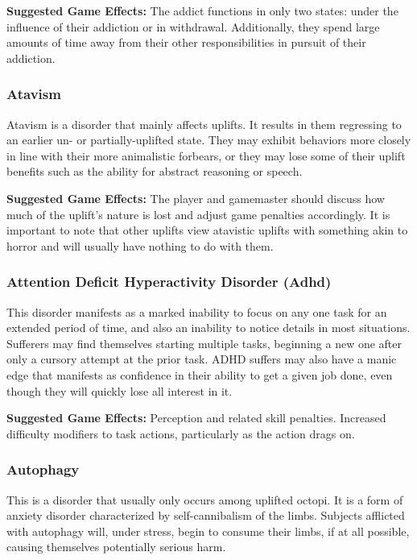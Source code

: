 \textbf{Suggested Game Effects: }The addict functions in 
only two states: under the influence of their addiction
or in withdrawal. Additionally, they spend large
amounts of time away from their other responsibilities
in pursuit of their addiction.

\subsubsection{Atavism}

Atavism is a disorder that mainly affects uplifts. It 
results in them regressing to an earlier un- or partially-uplifted
state. They may exhibit behaviors more
closely in line with their more animalistic forbears, or 
they may lose some of their uplift benefits such as the 
ability for abstract reasoning or speech.

\textbf{Suggested Game Effects: }The player and gamemaster
should discuss how much of the uplift's nature is
lost and adjust game penalties accordingly. It is important
to note that other uplifts view atavistic uplifts
with something akin to horror and will usually have 
nothing to do with them.

\subsubsection{Attention Deficit Hyperactivity Disorder (Adhd)}

This disorder manifests as a marked inability to focus 
on any one task for an extended period of time, and 
also an inability to notice details in most situations. 
Sufferers may find themselves starting multiple tasks, 
beginning a new one after only a cursory attempt at 
the prior task. ADHD suffers may also have a manic 
edge that manifests as confidence in their ability to get 
a given job done, even though they will quickly lose 
all interest in it.

\textbf{Suggested Game Effects:} Perception and related 
skill penalties. Increased difficulty modifiers to task 
actions, particularly as the action drags on.

\subsubsection{Autophagy}

This is a disorder that usually only occurs among uplifted
octopi. It is a form of anxiety disorder characterized
by self-cannibalism of the limbs. Subjects afflicted
with autophagy will, under stress, begin to consume 
their limbs, if at all possible, causing themselves potentially
serious harm.

